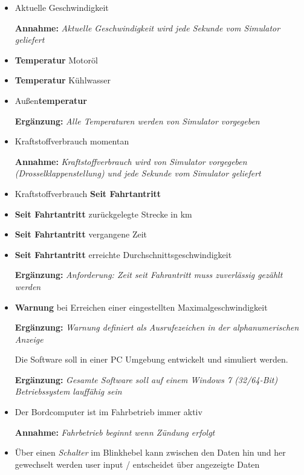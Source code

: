 \documentclass[a4paper,12pt]{article}
\begin{document}
\begin{itemize}

\item Aktuelle Geschwindigkeit

		\textbf{Annahme:} \emph{Aktuelle Geschwindigkeit wird jede Sekunde vom Simulator geliefert}

\item \textbf{Temperatur} Motoröl 
\item \textbf{Temperatur} Kühlwasser
\item Außen\textbf{temperatur}

		\textbf{Ergänzung:} \emph{Alle Temperaturen werden von Simulator vorgegeben}

\item Kraftstoffverbrauch momentan

		\textbf{Annahme:} \emph{Kraftstoffverbrauch wird von Simulator vorgegeben (Drosselklappenstellung) und jede Sekunde vom Simulator geliefert}

\item Kraftstoffverbrauch \textbf{Seit Fahrtantritt}
\item \textbf{Seit Fahrtantritt} zurückgelegte Strecke in km
\item \textbf{Seit Fahrtantritt} vergangene Zeit
\item \textbf{Seit Fahrtantritt} erreichte Durchschnittsgeschwindigkeit

		\textbf{Ergänzung:} \emph{Anforderung: Zeit seit Fahrantritt muss zuverlässig gezählt werden}

\item \textbf{Warnung} bei Erreichen einer eingestellten Maximalgeschwindigkeit

		\textbf{Ergänzung:} \emph{Warnung definiert als Ausrufezeichen in der alphanumerischen Anzeige}
		
Die Software soll in einer PC Umgebung entwickelt und simuliert werden.

\textbf{Ergänzung:} \emph{Gesamte Software soll auf einem Windows 7 (32/64-Bit) Betriebssystem lauffähig sein}


\item Der Bordcomputer ist im Fahrbetrieb immer aktiv

\textbf{Annahme:} \emph{Fahrbetrieb beginnt wenn Zündung erfolgt}

\item Über einen \emph{Schalter} im Blinkhebel kann zwischen den Daten hin und her gewechselt werden 
user input / entscheidet über angezeigte Daten


\end{itemize}
\end{document}
